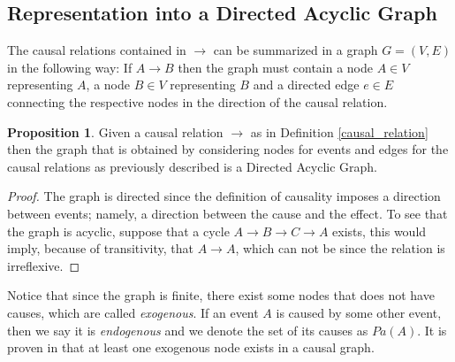 \documentclass[english,letterpaper,12pt,final]{article}
\theoremstyle{definition}
\newtheorem{prop}{Proposition}[section]
\begin{document}
	\subsection{Representation into a Directed Acyclic Graph}
	The causal relations contained in $\to$ can be summarized in a graph $G=(V,E)$ in the following way: If $A \to B$ then the graph must contain a node $A \in V$ representing $A$, a node  $B \in V$ representing $B$ and a directed edge $e \in E$ connecting the respective nodes in the direction of the causal relation.
	\begin{prop}
	Given a causal relation $\to$ as in Definition \ref{causal_relation} then the graph that is obtained by considering nodes for events and edges for the causal relations as previously described is a Directed Acyclic Graph.
	\end{prop}
	\begin{proof}
	The graph is directed since the definition of causality imposes a direction between events; namely, a direction between the cause and the effect. To see that the graph is acyclic, suppose that a cycle $A \to B \to C \to A$ exists, this would imply, because of transitivity, that $A \to A$, which can not be since the relation is irreflexive.
	\end{proof}
	Notice that since the graph is finite, there exist some nodes that does not have causes, which are called \textit{exogenous}. If an event $A$ is caused by some other event, then we say it is \textit{endogenous} and we denote the set of its causes as $Pa(A)$. It is proven in \cite{kiiveri1984recursive} that at least one exogenous node exists in a causal graph.
\end{document}
